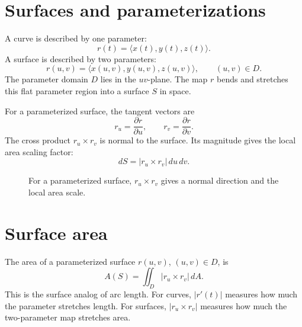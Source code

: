 \documentclass[11pt]{article}
\newcommand{\dA}{\,dA}
\newcommand{\du}{\,du}
\newcommand{\dv}{\,dv}
\begin{document}
\section{Surfaces and parameterizations}

A curve is described by one parameter:
\[
r(t)=\langle x(t),y(t),z(t)\rangle.
\]
A surface is described by two parameters:
\[
r(u,v)=\langle x(u,v),y(u,v),z(u,v)\rangle,\qquad (u,v)\in D.
\]
The parameter domain $D$ lies in the $uv$-plane. The map $r$ bends and stretches this flat parameter region into a surface $S$ in space.

For a parameterized surface, the tangent vectors are
\[
r_u=\frac{\partial r}{\partial u},\qquad r_v=\frac{\partial r}{\partial v}.
\]
The cross product $r_u\times r_v$ is normal to the surface. Its magnitude gives the local area scaling factor:
\[
dS=|r_u\times r_v|\du\dv.
\]

\begin{figure}[H]
\centering
{}
\caption{For a parameterized surface, $r_u\times r_v$ gives a normal direction and the local area scale.}
\end{figure}

\section{Surface area}

The area of a parameterized surface $r(u,v)$, $(u,v)\in D$, is
\[
A(S)=\iint_D |r_u\times r_v|\dA.
\]
This is the surface analog of arc length. For curves, $|r'(t)|$ measures how much the parameter stretches length. For surfaces, $|r_u\times r_v|$ measures how much the two-parameter map stretches area.
\end{document}
